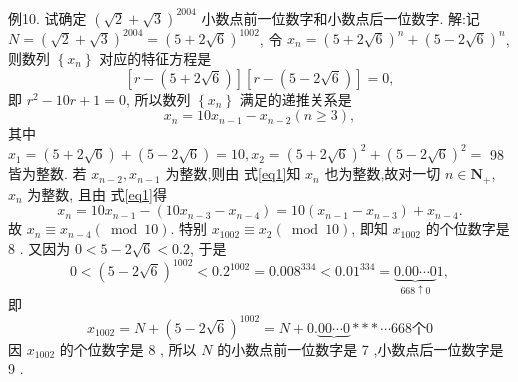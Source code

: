 例10. 试确定 $(\sqrt{2}+\sqrt{3})^{2004}$ 小数点前一位数字和小数点后一位数字.
解:记 $N=(\sqrt{2}+\sqrt{3})^{2004}=(5+2 \sqrt{6})^{1002}$, 令 $x_n=(5+2 \sqrt{6})^n+(5- 2 \sqrt{6})^n$, 则数列 $\left\{x_n\right\}$ 对应的特征方程是
$$
[r-(5+2 \sqrt{6})][r-(5-2 \sqrt{6})]=0,
$$
即 $r^2-10 r+1=0$, 所以数列 $\left\{x_n\right\}$ 满足的递推关系是
$$
x_n=10 x_{n-1}-x_{n-2}(n \geqslant 3), \label{eq1}
$$
其中 $x_1=(5+2 \sqrt{6})+(5-2 \sqrt{6})=10, x_2=(5+2 \sqrt{6})^2+(5-2 \sqrt{6})^2=$ 98 皆为整数.
若 $x_{n-2}, x_{n-1}$ 为整数,则由 式\ref{eq1}知 $x_n$ 也为整数,故对一切 $n \in \mathbf{N}_{+}$, $x_n$ 为整数, 且由 式\ref{eq1}得
$$
x_n=10 x_{n-1}-\left(10 x_{n-3}-x_{n-4}\right)=10\left(x_{n-1}-x_{n-3}\right)+x_{n-4} .
$$
故 $x_n \equiv x_{n-4}(\bmod 10)$. 特别 $x_{1002} \equiv x_2(\bmod 10)$, 即知 $x_{1002}$ 的个位数字是 8 . 又因为 $0<5-2 \sqrt{6}<0.2$, 于是
$$
0<(5-2 \sqrt{6})^{1002}<0.2^{1002}=0.008^{334}<0.01^{334}=\underbrace{0.00 \cdots 0}_{668 \uparrow 0} 1,
$$
即
$$
x_{1002}=N+(5-2 \sqrt{6})^{1002}=N+0 . \underbrace{00 \cdots 0} * * * \cdots 668 个 0
$$
因 $x_{1002}$ 的个位数字是 8 , 所以 $N$ 的小数点前一位数字是 7 ,小数点后一位数字是 9 .


